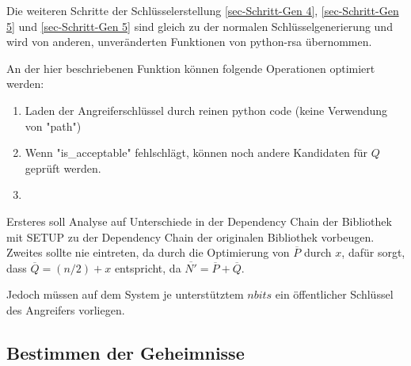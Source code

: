         Die weiteren Schritte der Schlüsselerstellung \ref{sec-Schritt-Gen 4}, \ref{sec-Schritt-Gen 5} und \ref{sec-Schritt-Gen 5} sind gleich zu der normalen Schlüsselgenerierung und wird von anderen, unveränderten Funktionen von python-rsa übernommen.

        An der hier beschriebenen Funktion können folgende Operationen optimiert werden:
        \begin{enumerate}
            \item Laden der Angreiferschlüssel durch reinen python code (keine Verwendung von "path")
            \item Wenn "is\_acceptable" fehlschlägt, können noch andere Kandidaten für $Q$ geprüft werden.
            \item 
        \end{enumerate}
        Ersteres soll Analyse auf Unterschiede in der Dependency Chain der Bibliothek mit \ac{SETUP} zu der Dependency Chain der originalen Bibliothek vorbeugen.
        Zweites sollte nie eintreten, da durch die Optimierung von $\overline{P}$ durch $x$, dafür sorgt, dass $\overline{Q} = (n/2) + x$ entspricht, da $\overline{N'} = \overline{P} + \overline{Q}$.

        Jedoch müssen auf dem System je unterstütztem $nbits$ ein öffentlicher Schlüssel des Angreifers vorliegen.

        \subsection{Bestimmen der Geheimnisse}